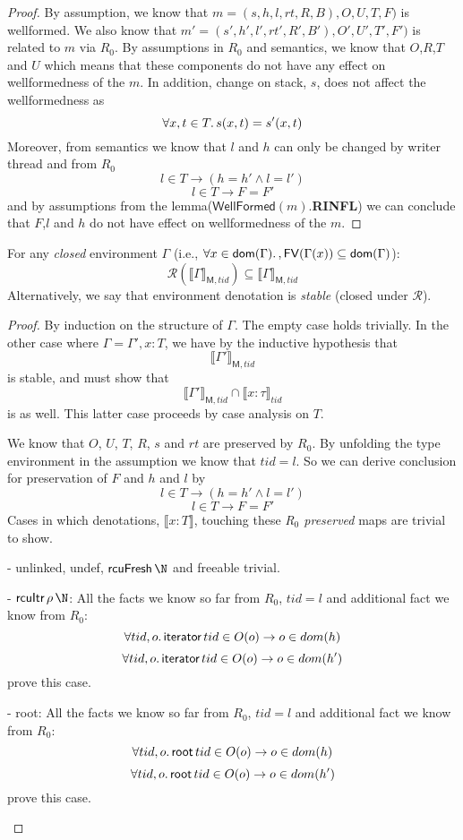 \begin{proof}
  By assumption, we know that $m = (s,h,l,rt,R,B),O,U,T,F)$ is wellformed. We also know that $m'= (s',h',l',rt',R',B'),O',U',T',F')$ is related to $m$ via $R_{0}$. By assumptions in $R_{0}$ and semantics, we know that $O$,$R$,$T$ and $U$ which means that these components do not have any effect on wellformedness of the $m$. In addition, change on stack, $s$, does not affect the wellformedness as
\[\forall x,t \in T \ldotp s(x,t) = s'(x,t) \]
Moreover, from semantics we know that $l$ and $h$ can only be changed by writer thread and from $R_0$
\[l  \in  T \rightarrow (h = h' \land l=l')\]
\[  l\in T\rightarrow F=F'\]
and by assumptions from the lemma($\mathsf{WellFormed}(m)$.\textbf{RINFL}) we can conclude that $F$,$l$ and $h$ do not have effect on wellformedness of the $m$.
\end{proof}
\begin{lemma}\label{lemma:stblw}
For any \emph{closed} environment $\Gamma$ (i.e., $\forall x\in\mathsf{dom}(\Gamma)\ldotp, \mathsf{FV}(\Gamma(x))\subseteq\mathsf{dom}(\Gamma)$):
\[
\mathcal{R}(\llbracket\Gamma\rrbracket_{\mathsf{M},tid})\subseteq\llbracket\Gamma\rrbracket_{\mathsf{M},tid}
\]
Alternatively, we say that environment denotation is \emph{stable} (closed under $\mathcal{R}$).
\end{lemma}
\begin{proof}
  By induction on the structure of $\Gamma$.  The empty case holds trivially.  In the other case where $\Gamma=\Gamma',x:T$, we have by the inductive hypothesis that
  \[\llbracket\Gamma'\rrbracket_{\mathsf{M},tid}\] is stable, and must show that
  \[\llbracket\Gamma'\rrbracket_{\mathsf{M},tid}\cap\llbracket{x:\tau}\rrbracket_{tid}\] is as well.  This latter case proceeds by case analysis on $T$.

We know that $O$, $U$, $T$, $R$, $s$ and $rt$ are preserved by $R_0$. By unfolding the type environment in the assumption we know that $tid = l$. So we can derive conclusion for preservation of $F$ and $h$ and $l$ by
\[l  \in  T \rightarrow (h = h' \land l=l')\]
\[  l\in T\rightarrow F=F'\]
Cases in which denotations, $\llbracket x:T \rrbracket$, touching these \emph{R$_0$ preserved} maps are trivial to show.
  \begin{case} - \textsf{unlinked}, \textsf{undef}, $\textsf{rcuFresh}\, \N$ and \textsf{freeable} trivial.
\begin{case} - $\textsf{rcuItr}\,\rho\,\N$: All the facts we know so far from $R_0$, $tid=l$ and additional fact we know from $R_0$:
  \[\forall tid,o\ldotp\textsf{iterator} \, tid \in O(o) \rightarrow o \in dom(h) \]
  \[\forall tid,o\ldotp\textsf{iterator} \, tid \in O(o) \rightarrow o \in dom(h')\]
  prove this case.
  \end{case}
  \end{case}
  \begin{case} - \textsf{root}: All the facts we know so far from $R_0$, $tid=l$ and additional fact we know from $R_0$:
    \[ \forall tid,o\ldotp\textsf{root} \, tid \in O(o) \rightarrow o \in dom(h) \]
    \[ \forall tid,o\ldotp\textsf{root} \, tid \in O(o) \rightarrow o \in dom(h') \]
    prove this case.
    \end{case}
\end{proof}
